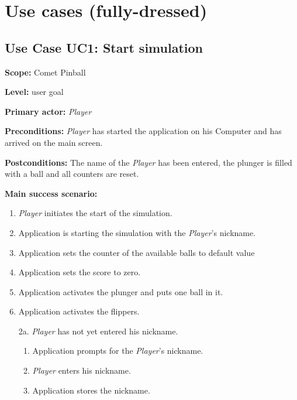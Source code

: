 \documentclass[fontsize=12pt,
               paper=a4,
               twoside=false,
               parskip=half,
               ]{scrartcl}
\begin{document}



\section{Use cases (fully-dressed)}

\subsection{Use Case UC1: Start simulation}

\textbf{\textsf{Scope:}} Comet Pinball

\textbf{\textsf{Level:}} user goal

\textbf{\textsf{Primary actor:}} \emph{Player}

\textbf{\textsf{Preconditions:}} \emph{Player} has started the application on his Computer and has arrived on the main screen.

\textbf{\textsf{Postconditions:}} The name of the \emph{Player} has been entered, the plunger is filled with a ball and all counters are reset.

\textbf{\textsf{Main success scenario:}}

\begin{enumerate}[leftmargin=3em]
	\item \emph{Player} initiates the start of the simulation.
	\item Application is starting the simulation with the \emph{Player}'s nickname.
	\item Application sets the counter of the available balls to default value
	\item Application sets the score to zero.
	\item Application activates the plunger and puts one ball in it. 
	\item Application activates the flippers.
\end{enumerate}


\begin{itemize}[leftmargin=3em]
	\item[2a.] 	\emph{Player} has not yet entered his nickname.
	\begin{enumerate}
		\item Application prompts for the \emph{Player}'s nickname.
		\item \emph{Player} enters his nickname.
		\item Application stores the nickname.
	\end{enumerate}
\end{itemize}
\end{document}
